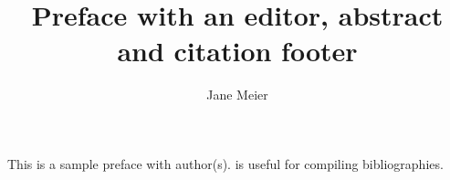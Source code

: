 \documentclass[output=paper]{langsci/langscibook}
\title{Preface with an editor, abstract and citation footer}
\author{Jane Meier  \affiliation{University of Eden}}
\begin{document}
\maketitle

\noindent This is a sample preface with author(s). 
\citet{Nordhoff2018} is useful for compiling bibliographies.

\sloppy
\printbibliography[heading=subbibliography,notkeyword=this]
\end{document}

